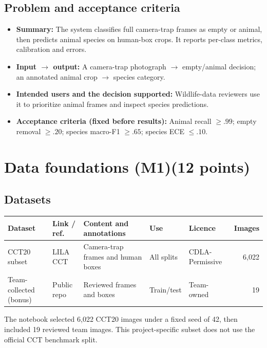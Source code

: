 \documentclass[11pt,a4paper]{article}
\newcommand{\pts}[1]{\texorpdfstring{\hfill{\normalsize\mdseries(#1 points)}}{}}
\begin{document}
\subsection*{Problem and acceptance criteria}

\begin{itemize}[leftmargin=1.2em]
  \item \textbf{Summary:} The system classifies full camera-trap frames as empty or animal, then predicts animal species on human-box crops. It reports per-class metrics, calibration and errors.
  \item \textbf{Input $\rightarrow$ output:} A camera-trap photograph $\rightarrow$ empty/animal decision; an annotated animal crop $\rightarrow$ species category.
  \item \textbf{Intended users and the decision supported:} Wildlife-data reviewers use it to prioritize animal frames and inspect species predictions.
  \item \textbf{Acceptance criteria (fixed before results):} Animal recall $\geq .99$; empty removal $\geq .20$; species macro-F1 $\geq .65$; species ECE $\leq .10$.
\end{itemize}

\section{Data foundations (M1)\pts{12}}

\subsection{Datasets}

{\small
\begin{tabularx}{\linewidth}{@{}l l Y l l r@{}}
\toprule
Dataset & Link / ref. & Content and annotations & Use & Licence & Images \\
\midrule
CCT20 subset & LILA CCT & Camera-trap frames and human boxes & All splits & CDLA-Permissive & 6,022 \\
Team-collected (bonus) & Public repo & Reviewed frames and boxes & Train/test & Team-owned & 19 \\
\bottomrule
\end{tabularx}}

\smallskip
The notebook selected 6,022 CCT20 images under a fixed seed of 42, then included 19 reviewed team images. This project-specific subset does not use the official CCT benchmark split.
\end{document}
